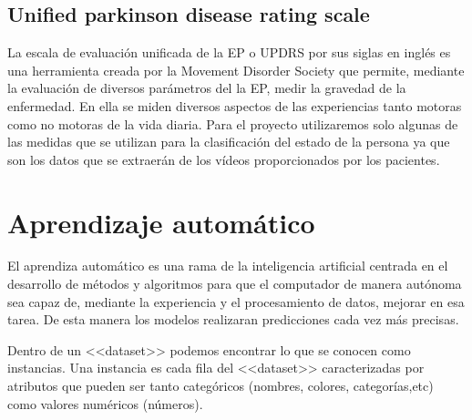 \subsection{Unified parkinson disease rating scale}

La escala de evaluación unificada de la EP o UPDRS por sus siglas en inglés es una herramienta creada por la Movement Disorder Society que permite, mediante la evaluación de diversos parámetros del la EP, medir la gravedad de la enfermedad. En ella se miden diversos aspectos de las experiencias tanto motoras como no motoras de la vida diaria. Para el proyecto utilizaremos solo algunas de las medidas que se utilizan para la clasificación del estado de la persona ya que son los datos que se extraerán de los vídeos proporcionados por los pacientes.


\section{Aprendizaje automático}

El aprendiza automático es una rama de la inteligencia artificial centrada en el desarrollo de métodos y algoritmos para que el computador de manera autónoma sea capaz de, mediante la experiencia y el procesamiento de datos, mejorar en esa tarea. De esta manera los modelos realizaran predicciones cada vez más precisas.

Dentro de un <<dataset>> podemos encontrar lo que se conocen como instancias. Una instancia es cada fila del <<dataset>> caracterizadas por atributos que pueden ser tanto categóricos (nombres, colores, categorías,etc) como valores numéricos (números).

